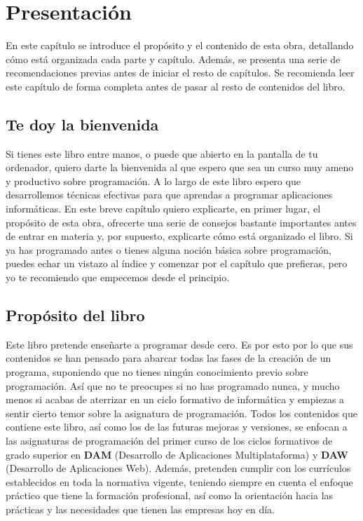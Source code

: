 
\chapter{Presentación}

En este capítulo se introduce el propósito y el contenido de esta obra, detallando cómo está organizada cada parte y capítulo.
Además, se presenta una serie de recomendaciones previas antes de iniciar el resto de capítulos. Se recomienda leer este
capítulo de forma completa antes de pasar al resto de contenidos del libro.

\section{Te doy la bienvenida}

Si tienes este libro entre manos, o puede que abierto en la pantalla de tu ordenador, quiero darte la bienvenida al que espero que 
sea un curso muy ameno y productivo sobre programación. A lo largo de este libro espero que desarrollemos técnicas efectivas
para que aprendas a programar aplicaciones informáticas. En este breve capítulo quiero explicarte, en primer lugar, el propósito de esta
obra, ofrecerte una serie de consejos bastante importantes antes de entrar en materia y, por supuesto, explicarte cómo está organizado
el libro. Si ya has programado antes o tienes alguna noción básica sobre programación, puedes echar un vistazo al índice y comenzar
por el capítulo que prefieras, pero yo te recomiendo que empecemos desde el principio. 

\section{Propósito del libro}

Este libro pretende enseñarte a programar desde cero. Es por esto por lo que sus contenidos se han pensado para abarcar todas las fases
de la creación de un programa, suponiendo que no tienes ningún conocimiento previo sobre programación. Así que no te preocupes si no
has programado nunca, y mucho menos si acabas de aterrizar en un ciclo formativo de informática y empiezas a sentir cierto temor sobre
la asignatura de programación. Todos los contenidos que contiene este libro, así como los de las futuras mejoras y versiones, se 
enfocan a las asignaturas de programación del primer curso de los ciclos formativos de grado superior en \textbf{DAM} (Desarrollo de 
Aplicaciones Multiplataforma) y \textbf{DAW} (Desarrollo de Aplicaciones Web). Además, pretenden cumplir con los currículos establecidos en toda
la normativa vigente, teniendo siempre en cuenta el enfoque práctico que tiene la formación profesional, así como la orientación
hacia las prácticas y las necesidades que tienen las empresas hoy en día.

